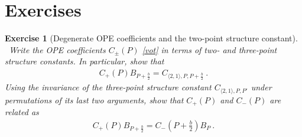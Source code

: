 \documentclass[12pt, a4paper, notitlepage, twoside]{report}
\numberwithin{equation}{section}
\theoremstyle{break}
\newtheorem{exo}{Exercise}[chapter]
\begin{document}
\section{Exercises}

\begin{exo}[Degenerate OPE coefficients and the two-point structure constant]
 ~\label{exocpcm}
 Write the OPE coefficients $C_\pm(P)$ \eqref{vot} in terms of two- and three-point structure constants. In particular, show that 
 \begin{align}
  C_+(P)B_{P+\tfrac{b}{2}} = C_{\langle 2,1\rangle, P, P+\frac{b}{2}}\ . 
 \end{align}
 Using the invariance of the three-point structure constant $C_{\langle 2,1\rangle, P,P'}$ under permutations of its last two arguments, show that $C_+(P)$ and $C_-(P)$ are related as
 \begin{align}
  C_+(P)B_{P+\tfrac{b}{2}} = C_-(P+\tfrac{b}{2}) B_{P}\ .
 \end{align}
\end{exo}
\end{document}
